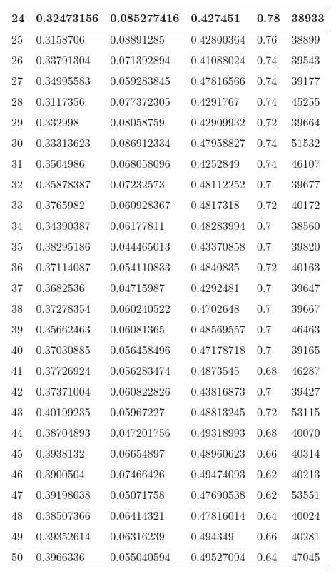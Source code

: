 \begin{longtable}{|l|l|l|l|l|l|}
24 & 0.32473156 & 0.085277416 & 0.427451 & 0.78 & 38933 \\ \hline 
25 & 0.3158706 & 0.08891285 & 0.42800364 & 0.76 & 38899 \\ \hline 
26 & 0.33791304 & 0.071392894 & 0.41088024 & 0.74 & 39543 \\ \hline 
27 & 0.34995583 & 0.059283845 & 0.47816566 & 0.74 & 39177 \\ \hline 
28 & 0.3117356 & 0.077372305 & 0.4291767 & 0.74 & 45255 \\ \hline 
29 & 0.332998 & 0.08058759 & 0.42909932 & 0.72 & 39664 \\ \hline 
30 & 0.33313623 & 0.086912334 & 0.47958827 & 0.74 & 51532 \\ \hline 
31 & 0.3504986 & 0.068058096 & 0.4252849 & 0.74 & 46107 \\ \hline 
32 & 0.35878387 & 0.07232573 & 0.48112252 & 0.7 & 39677 \\ \hline 
33 & 0.3765982 & 0.060928367 & 0.4817318 & 0.72 & 40172 \\ \hline 
34 & 0.34390387 & 0.06177811 & 0.48283994 & 0.7 & 38560 \\ \hline 
35 & 0.38295186 & 0.044465013 & 0.43370858 & 0.7 & 39820 \\ \hline 
36 & 0.37114087 & 0.054110833 & 0.4840835 & 0.72 & 40163 \\ \hline 
37 & 0.3682536 & 0.04715987 & 0.4292481 & 0.7 & 39647 \\ \hline 
38 & 0.37278354 & 0.060240522 & 0.4702648 & 0.7 & 39667 \\ \hline 
39 & 0.35662463 & 0.06081365 & 0.48569557 & 0.7 & 46463 \\ \hline 
40 & 0.37030885 & 0.056458496 & 0.47178718 & 0.7 & 39165 \\ \hline 
41 & 0.37726924 & 0.056283474 & 0.4873545 & 0.68 & 46287 \\ \hline 
42 & 0.37371004 & 0.060822826 & 0.43816873 & 0.7 & 39427 \\ \hline 
43 & 0.40199235 & 0.05967227 & 0.48813245 & 0.72 & 53115 \\ \hline 
44 & 0.38704893 & 0.047201756 & 0.49318993 & 0.68 & 40070 \\ \hline 
45 & 0.3938132 & 0.06654897 & 0.48960623 & 0.66 & 40314 \\ \hline 
46 & 0.3900504 & 0.07466426 & 0.49474093 & 0.62 & 40213 \\ \hline 
47 & 0.39198038 & 0.05071758 & 0.47690538 & 0.62 & 53551 \\ \hline 
48 & 0.38507366 & 0.06414321 & 0.47816014 & 0.64 & 40024 \\ \hline 
49 & 0.39352614 & 0.06316239 & 0.494349 & 0.66 & 40281 \\ \hline 
50 & 0.3966336 & 0.055040594 & 0.49527094 & 0.64 & 47045 \\ \hline 
\end{longtable}